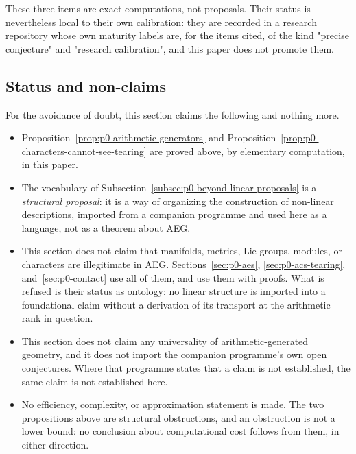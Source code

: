 These three items are exact computations, not proposals.  Their status is
nevertheless local to their own calibration: they are recorded in a research
repository whose own maturity labels are, for the items cited, of the kind
"precise conjecture" and "research calibration", and this paper does not promote
them.

\subsection{Status and non-claims}

For the avoidance of doubt, this section claims the following and nothing more.

\begin{itemize}
  \item Proposition~\ref{prop:p0-arithmetic-generators} and
  Proposition~\ref{prop:p0-characters-cannot-see-tearing} are proved above, by
  elementary computation, in this paper.
  \item The vocabulary of Subsection~\ref{subsec:p0-beyond-linear-proposals} is a
  \emph{structural proposal}: it is a way of organizing the construction of
  non-linear descriptions, imported from a companion programme and used here as
  a language, not as a theorem about AEG.
  \item This section does not claim that manifolds, metrics, Lie groups,
  modules, or characters are illegitimate in AEG.  Sections~\ref{sec:p0-aes},
  \ref{sec:p0-acs-tearing}, and~\ref{sec:p0-contact} use all of them, and use
  them with proofs.  What is refused is their status as ontology: no linear
  structure is imported into a foundational claim without a derivation of its
  transport at the arithmetic rank in question.
  \item This section does not claim any universality of arithmetic-generated
  geometry, and it does not import the companion programme's own open
  conjectures.  Where that programme states that a claim is not established, the
  same claim is not established here.
  \item No efficiency, complexity, or approximation statement is made.  The two
  propositions above are structural obstructions, and an obstruction is not a
  lower bound: no conclusion about computational cost follows from them, in
  either direction.
\end{itemize}
